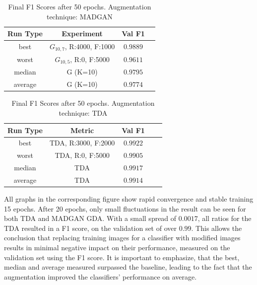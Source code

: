 \begin{table}[H]
	\vspace{-1.5em}
	\centering
	\begin{tabular}{|c|c|c|c|}
		\hline
		Run Type & Experiment & Val F1 \\ \hline
		best & \(G_{10, 7}\), R:4000, F:1000 & $0.9889$\\ \hline
		worst & \(G_{10, 5}\), R:0, F:5000 & $0.9611$\\ \hline
		median & G (K=10) & $0.9795$\\ \hline
		average & G (K=10) & $0.9774$
		\\ \hline
	\end{tabular}
    \caption{Final F1 Scores after 50 epochs. Augmentation technique: MADGAN}
        \label{tab:res_replacement_mnist_tda_vs_madgan__madgan}
\end{table}
\begin{table}[H]
	\centering
	\vspace{-1.5em}
	\begin{tabular}{|c|c|c|c|c|}
		\hline
		Run Type & Metric & Val F1 \\ \hline
		best & TDA, R:3000, F:2000 & $0.9922$\\ \hline
		worst & TDA, R:0, F:5000 & $0.9905$\\ \hline
		median & TDA & $0.9917$\\ \hline
		average & TDA & $0.9914$
		\\ \hline
	\end{tabular}
    \caption{Final F1 Scores after 50 epochs. Augmentation technique: TDA}
        \label{tab:res_replacement_mnist_tda_vs_madgan__tda}
\end{table}

All graphs in the corresponding figure show rapid convergence and stable training 15 epochs. After 20 epochs, only small fluctuations in the result can be seen for both TDA and MADGAN GDA. With a small spread of $0.0017$, all ratios for the TDA resulted in a F1 score, on the validation set of over $0.99$. This allows the conclusion that replacing training images for a classifier with modified images results in minimal negative impact on their performance, measured on the validation set using the F1 score. It is important to emphasize, that the best, median and average measured surpassed the baseline, leading to the fact that the augmentation improved the classifiers' performance on average.

